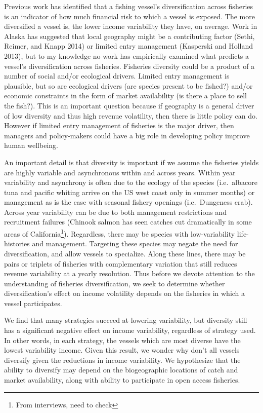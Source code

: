 \documentclass[]{article}
\let\rmarkdownfootnote\footnote%
\def\footnote{\protect\rmarkdownfootnote}
\begin{document}
Previous work has identified that a fishing vessel's diversification
across fisheries is an indicator of how much financial risk to which a
vessel is exposed. The more diversified a vessel is, the lower income
variability they have, on average. Work in Alaska has suggested that
local geography might be a contributing factor (Sethi, Reimer, and Knapp
2014) or limited entry management (Kasperski and Holland 2013), but to
my knowledge no work has empirically examined what predicts a vessel's
diversification across fisheries. Fisheries diversity could be a product
of a number of social and/or ecological drivers. Limited entry
management is plausible, but so are ecological drivers (are species
present to be fished?) and/or economic constraints in the form of market
availability (is there a place to sell the fish?). This is an important
question because if geography is a general driver of low diversity and
thus high revenue volatility, then there is little policy can do.
However if limited entry management of fisheries is the major driver,
then managers and policy-makers could have a big role in developing
policy improve human wellbeing.

An important detail is that diversity is important if we assume the
fisheries yields are highly variable and asynchronous within and across
years. Within year variability and asynchrony is often due to the
ecology of the species (i.e.~albacore tuna and pacific whiting arrive on
the US west coast only in summer months) or management as is the case
with seasonal fishery openings (i.e.~Dungeness crab). Across year
variability can be due to both management restrictions and recruitment
failures (Chinook salmon has seen catches cut dramatically in some areas
of California\footnote{From interviews, need to check}). Regardless,
there may be species with low-variability life-histories and management.
Targeting these species may negate the need for diversification, and
allow vessels to specialize. Along these lines, there may be pairs or
triplets of fisheries with complementary variation that still reduces
revenue variability at a yearly resolution. Thus before we devote
attention to the understanding of fisheries diversification, we seek to
determine whether diversification's effect on income volatility depends
on the fisheries in which a vessel participates.

We find that many strategies succeed at lowering variability, but
diversity still has a significant negative effect on income variability,
regardless of strategy used. In other words, in each strategy, the
vessels which are most diverse have the lowest variability income. Given
this result, we wonder why don't all vessels diversify given the
reductions in income variability. We hypothesize that the ability to
diversify may depend on the biogeographic locations of catch and market
availability, along with ability to participate in open access
fisheries.
\end{document}
